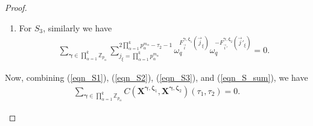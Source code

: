 \documentclass[pdflatex,sn-mathphys-num]{sn-jnl}%
\theoremstyle{thmstyleone}
\begin{document}
\begin{proof}
\begin{mycases}
\begin{enumerate}
				\item For $S_3$, similarly we have
				\begin{equation}\label{eqn_S3}
					\begin{split}
						\sum_{\bm{\gamma} \in \prod_{\alpha=1}^{k} \mathbb{Z}_{p_\alpha}}^{} \sum_{j_{\xi}= \prod_{\alpha=1}^{k} p_\alpha^{m_\alpha}}^{2 \prod_{\alpha=1}^{k} p_\alpha^{m_\alpha} -\tau_2-1} \omega_q^{ 	F_{ \vec{i}}^{\bm{\gamma}, \bm{\zeta}_1} (\vec{j}_{\xi}) } \omega_q^{ 	-F_{ \vec{i}'}^{\bm{\gamma}, \bm{\zeta}_2} (\vec{j}'_{\xi}) }=0.
					\end{split}
				\end{equation}
			\end{enumerate}
			Now, combining (\ref{eqn_S1}), (\ref{eqn_S2}), (\ref{eqn_S3}), and (\ref{eqn_S_sum}), we have
			\begin{equation}
				\begin{split}
					\sum_{\bm{\gamma} \in \prod_{\alpha=1}^{k} \mathbb{Z}_{p_\alpha}}^{} C\left( \mathbf{X}^{\bm{\gamma},\bm{\zeta}_1}, \mathbf{X}^{\bm{\gamma},\bm{\zeta}_2} \right) (\tau_1, \tau_2)=0.
				\end{split}
			\end{equation}
			

\end{mycases}
\end{proof}
\end{document}
